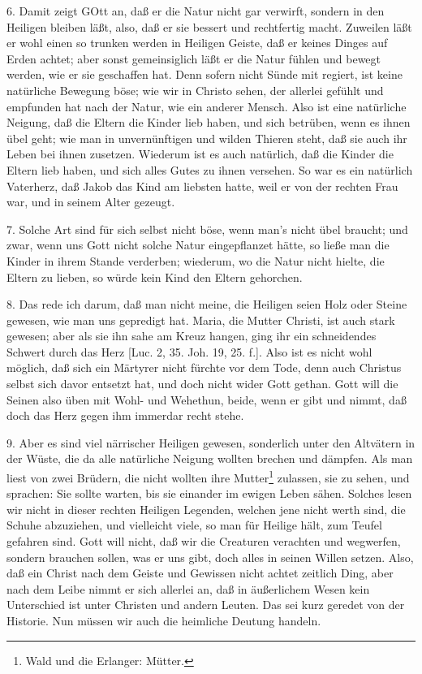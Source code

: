 6. Damit zeigt GOtt an, daß er die Natur nicht gar verwirft, sondern in den Heiligen bleiben läßt, also, daß er sie bessert und rechtfertig macht. Zuweilen läßt er wohl einen so trunken werden in Heiligen Geiste, daß er keines Dinges auf Erden achtet; aber sonst gemeinsiglich läßt er die Natur fühlen und bewegt werden, wie er sie geschaffen hat. Denn sofern nicht Sünde mit regiert, ist keine natürliche Bewegung böse; wie wir in Christo sehen, der allerlei gefühlt und empfunden hat nach der Natur, wie ein anderer Mensch. Also ist eine natürliche Neigung, daß die Eltern die Kinder lieb haben, und sich betrüben, wenn es ihnen übel geht; wie man
in unvernünftigen und wilden Thieren steht, daß sie auch ihr Leben bei ihnen zusetzen. Wiederum ist es auch natürlich, daß die Kinder die Eltern lieb haben, und sich alles Gutes zu ihnen versehen. So war es ein natürlich Vaterherz, daß Jakob das Kind am liebsten hatte, weil er von der rechten Frau war, und in seinem Alter gezeugt.

7. Solche Art sind für sich selbst nicht böse, wenn man’s nicht übel braucht; und zwar, wenn uns Gott nicht solche Natur eingepflanzet hätte, so ließe man die Kinder in ihrem Stande verderben; wiederum, wo die Natur nicht hielte, die Eltern zu lieben, so würde kein Kind den Eltern gehorchen.

8. Das rede ich darum, daß man nicht meine, die Heiligen seien Holz oder Steine gewesen, wie man uns gepredigt hat. Maria, die Mutter Christi, ist auch stark gewesen; aber als sie ihn sahe am Kreuz hangen, ging ihr ein schneidendes Schwert durch das Herz [Luc. 2, 35. Joh. 19, 25. f.]. Also ist es nicht wohl möglich, daß sich ein Märtyrer nicht fürchte vor dem Tode, denn auch Christus selbst sich davor entsetzt hat, und doch nicht wider Gott gethan. Gott will die Seinen also üben mit Wohl- und Wehethun, beide, wenn er gibt und nimmt, daß doch das Herz gegen ihm immerdar recht stehe.

9. Aber es sind viel närrischer Heiligen gewesen, sonderlich unter den Altvätern in der Wüste, die da alle natürliche Neigung wollten brechen und dämpfen. Als man liest von zwei Brüdern, die nicht wollten ihre Mutter\footnote{Wald und die Erlanger: Mütter.} zulassen, sie zu sehen, und sprachen: Sie sollte warten, bis sie einander im ewigen Leben sähen. Solches lesen wir nicht in dieser rechten Heiligen Legenden, welchen jene nicht werth sind, die Schuhe abzuziehen, und vielleicht viele, so man für Heilige hält, zum Teufel gefahren sind. Gott will nicht, daß wir die Creaturen verachten und wegwerfen, sondern brauchen sollen, was er uns gibt, doch alles in seinen Willen setzen. Also, daß ein Christ nach dem Geiste und Gewissen nicht achtet zeitlich Ding, aber nach dem Leibe nimmt er sich allerlei an, daß in äußerlichem Wesen kein Unterschied ist unter Christen und andern Leuten. Das sei kurz geredet von der Historie. Nun müssen wir auch die heimliche Deutung handeln.


